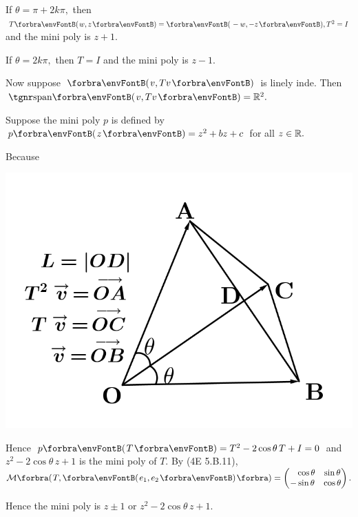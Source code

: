 \documentclass[a4paper, 11pt, UTF8]{article}
\begin{document}
\begin{large}
\par\quad
If $\theta=\pi+2k\pi,$ then $T\Par{w,z}=\Par{-w,-z},T^2=I$ and the mini poly is $z+1.$\par\quad
If $\theta=2k\pi,$ then $T=I$ and the mini poly is $z-1.$\par\quad
Now suppose $\Par{v,Tv}$ is linely inde. Then $\Span{v,Tv}=\Rbb^2.$\par\quad
Suppose the mini poly $p$ is defined by $p\Par{z}=z^2+bz+c$ for all $z\in{\mathbb{R}}.$\par\vspace{12pt}\quad
Because\vspace{-28pt}\par\quad
\hspace{45pt}\includegraphics[scale=0.22]{./diagram.png}\par\vspace{-70pt}\quad
{}\par\vspace{8pt}\quad
Hence $p\Par{T}=T^2-2\cos\theta\, T+I=0$ and $z^2-2\cos\theta\, z+1$ is the mini poly of $T.$\PfEnd\vspace{3pt}\quad
\Or By (4E 5.B.11), $\Mt[\BigPar]{T,\Par{e_1,e_2}}=
\begin{pmatrix}
	\Blind{-}\cos\theta & \sin\theta\\
	-\sin\theta & \cos\theta
\end{pmatrix}.$\par\quad
Hence the mini poly is $z\pm 1$ or $z^2-2\cos\theta\,z+1.$\PfEnd
\SepLine


\end{large}
\end{document}

